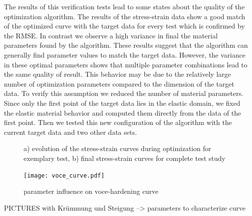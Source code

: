     The results of this verification tests lead to some states about the quality of the optimization algorithm. The results of the stress-strain data show a good match of the optimized curve with the target data for every test which is confirmed by the RMSE. In contrast we observe a high variance in final the material parameters found by the algorithm. These results suggest that the algorithm can generally find parameter values to match the target data. However, the variance in these optimal parameters shows that multiple parameter combinations lead to the same quality of result. This behavior may be due to the relatively large number of optimization parameters compared to the dimension of the target data. To verify this assumption we reduced the number of material parameters. Since only the first point of the target data lies in the elastic domain, we fixed the elastic material behavior and computed them directly from the data of the first point. Then we tested this new configuration of the algorithm with the current target data and two other data sets.


    \begin{figure}[H]
        \centering
        \caption{a) evolution of the stress-strain curves during optimization for exemplary test, b) final stress-strain curves for complete test study}
        \label{fig:complete}
    \end{figure}


   
   \begin{figure}[H]
		\centering
        \texttt{[image: voce\_curve.pdf]}
		\caption{parameter influence on voce-hardening curve}
		\label{fig:Parameter influence on VOCE-hardening curve}
	\end{figure}
    PICTURES with Krümmung und Steigung --> parameters to characterize curve


